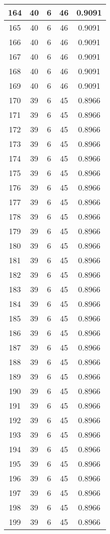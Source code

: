 \documentclass[letterpaper, 12pt]{article}
\begin{document}
\begin{longtable}{|c|c|c|c|c|}
\hline
164 & 40 & 6 & 46 & 0.9091 \\
\hline
165 & 40 & 6 & 46 & 0.9091 \\
\hline
166 & 40 & 6 & 46 & 0.9091 \\
\hline
167 & 40 & 6 & 46 & 0.9091 \\
\hline
168 & 40 & 6 & 46 & 0.9091 \\
\hline
169 & 40 & 6 & 46 & 0.9091 \\
\hline
170 & 39 & 6 & 45 & 0.8966 \\
\hline
171 & 39 & 6 & 45 & 0.8966 \\
\hline
172 & 39 & 6 & 45 & 0.8966 \\
\hline
173 & 39 & 6 & 45 & 0.8966 \\
\hline
174 & 39 & 6 & 45 & 0.8966 \\
\hline
175 & 39 & 6 & 45 & 0.8966 \\
\hline
176 & 39 & 6 & 45 & 0.8966 \\
\hline
177 & 39 & 6 & 45 & 0.8966 \\
\hline
178 & 39 & 6 & 45 & 0.8966 \\
\hline
179 & 39 & 6 & 45 & 0.8966 \\
\hline
180 & 39 & 6 & 45 & 0.8966 \\
\hline
181 & 39 & 6 & 45 & 0.8966 \\
\hline
182 & 39 & 6 & 45 & 0.8966 \\
\hline
183 & 39 & 6 & 45 & 0.8966 \\
\hline
184 & 39 & 6 & 45 & 0.8966 \\
\hline
185 & 39 & 6 & 45 & 0.8966 \\
\hline
186 & 39 & 6 & 45 & 0.8966 \\
\hline
187 & 39 & 6 & 45 & 0.8966 \\
\hline
188 & 39 & 6 & 45 & 0.8966 \\
\hline
189 & 39 & 6 & 45 & 0.8966 \\
\hline
190 & 39 & 6 & 45 & 0.8966 \\
\hline
191 & 39 & 6 & 45 & 0.8966 \\
\hline
192 & 39 & 6 & 45 & 0.8966 \\
\hline
193 & 39 & 6 & 45 & 0.8966 \\
\hline
194 & 39 & 6 & 45 & 0.8966 \\
\hline
195 & 39 & 6 & 45 & 0.8966 \\
\hline
196 & 39 & 6 & 45 & 0.8966 \\
\hline
197 & 39 & 6 & 45 & 0.8966 \\
\hline
198 & 39 & 6 & 45 & 0.8966 \\
\hline
199 & 39 & 6 & 45 & 0.8966 \\
\hline
\end{longtable}
\end{document}
